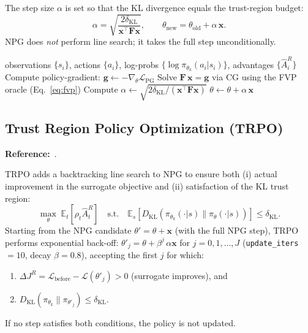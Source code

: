 \documentclass[12pt,a4paper]{article}
\theoremstyle{definition}
\newcommand{\E}{\mathbb{E}}
\newcommand{\piold}{\pi_{\theta_k}}
\newcommand{\KL}{D_{\mathrm{KL}}}
\newcommand{\Fmat}{\mathbf{F}}
\newcommand{\gvec}{\mathbf{g}}
\newcommand{\xvec}{\mathbf{x}}
\begin{document}
The step size $\alpha$ is set so that the KL divergence equals the trust-region budget:
\begin{equation}
  \label{eq:npg_step}
  \alpha = \sqrt{\frac{2\delta_{\mathrm{KL}}}{\xvec^\top\Fmat\xvec}},
  \qquad
  \theta_{\mathrm{new}} = \theta_{\mathrm{old}} + \alpha\,\xvec.
\end{equation}
NPG does \emph{not} perform line search; it takes the full step unconditionally.

\begin{algorithm}[h]
\caption{Natural Policy Gradient (NPG) -- actor update}
\label{alg:npg}
\begin{algorithmic}[1]
\Require observations $\{s_i\}$, actions $\{a_i\}$, log-probs $\{\log\piold(a_i|s_i)\}$, advantages $\{\hat{A}_i^R\}$
\State Compute policy-gradient: $\gvec \leftarrow -\nabla_\theta\mathcal{L}_{\mathrm{PG}}$
\State Solve $\Fmat\,\xvec = \gvec$ via CG using the FVP oracle (Eq.~\ref{eq:fvp})
\State Compute $\alpha \leftarrow \sqrt{2\delta_{\mathrm{KL}}/(\xvec^\top\Fmat\xvec)}$
\State $\theta \leftarrow \theta + \alpha\,\xvec$
\end{algorithmic}
\end{algorithm}

\subsection{Trust Region Policy Optimization (TRPO)}
\label{sec:trpo}

\textbf{Reference:}~\citet{schulman2015trust}.

TRPO adds a backtracking line search to NPG to ensure both (i) actual improvement in the
surrogate objective and (ii) satisfaction of the KL trust region:
\begin{equation}
  \label{eq:trpo_obj}
  \max_\theta \;\E_t\!\left[\rho_t\hat{A}_t^R\right]
  \quad\text{s.t.}\quad \E_s\!\left[\KL(\piold(\cdot|s)\|\pi_\theta(\cdot|s))\right] \leq \delta_{\mathrm{KL}}.
\end{equation}
Starting from the NPG candidate $\theta' = \theta + \xvec$ (with the full NPG step), TRPO
performs exponential back-off: $\theta'_j = \theta + \beta^j\,\alpha\xvec$ for
$j=0,1,\ldots,J$ (\texttt{update\_iters} $ = 10$, decay $\beta = 0.8$), accepting the
first $j$ for which:
\begin{enumerate}[nosep]
  \item $\Delta J^R = \mathcal{L}_{\mathrm{before}} - \mathcal{L}(\theta'_j) > 0$ (surrogate improves), and
  \item $\KL(\piold\|\pi_{\theta'_j}) \leq \delta_{\mathrm{KL}}$.
\end{enumerate}
If no step satisfies both conditions, the policy is not updated.
\end{document}
